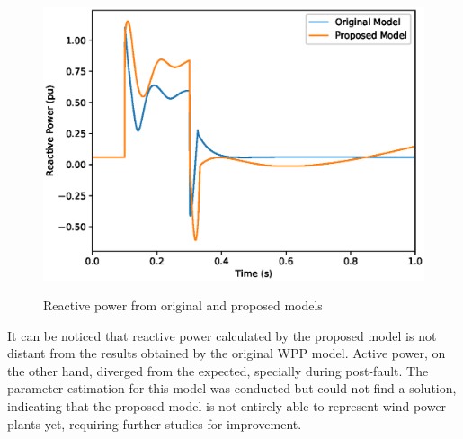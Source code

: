 \begin{figure}[!h]
	\centering
	\caption{Reactive power from original and proposed models}
	\includegraphics[scale=.7]{Images/Q_proposed.eps}
	\label{fig: proposed_Q}
\end{figure}

It can be noticed that reactive power calculated by the proposed model is not distant from the results obtained by the original WPP model. Active power, on the other hand, diverged from the expected, specially during post-fault. The parameter estimation for this model was conducted but could not find a solution, indicating that the proposed model is not entirely able to represent wind power plants yet, requiring further studies for improvement.
